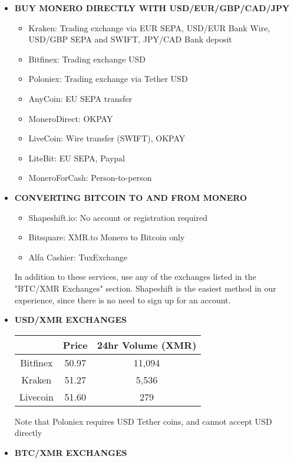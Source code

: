 	\begin{itemize}
		\item \textbf{BUY MONERO DIRECTLY WITH USD/EUR/GBP/CAD/JPY}
			\begin{itemize}
				\item Kraken: Trading exchange via EUR SEPA, USD/EUR Bank Wire, USD/GBP SEPA and SWIFT, JPY/CAD Bank deposit
				\item Bitfinex: Trading exchange USD
				\item Poloniex: Trading exchange via Tether USD
				\item AnyCoin: EU SEPA transfer
				\item MoneroDirect: OKPAY
				\item LiveCoin: Wire transfer (SWIFT), OKPAY
				\item LiteBit: EU SEPA, Paypal
				\item MoneroForCash: Person-to-person
			\end{itemize}
		\item \textbf{CONVERTING BITCOIN TO AND FROM MONERO}
			\begin{itemize}
				\item Shapeshift.io: No account or registration required
				\item Bitsquare: XMR.to Monero to Bitcoin only
				\item Alfa Cashier: TuxExchange
			\end{itemize}
			In addition to these services, use any of the exchanges listed in the "BTC/XMR Exchanges" section. Shapeshift is the easiest method in our experience, since there is no need to sign up for an account.
		\item \textbf{USD/XMR EXCHANGES}
			\begin{table}[H]
				\centering
				\begin{tabular}{ccc}
					\hline
						&Price	&24hr Volume (XMR)\\
					\hline
					Bitfinex	&50.97	&11,094 \\
					\hline
					Kraken	&51.27	&5,536 \\
					\hline
					Livecoin	&51.60	&279 \\
					\hline
				\end{tabular}
			\end{table}
			Note that Poloniex requires USD Tether coins, and cannot accept USD directly
		\item \textbf{BTC/XMR EXCHANGES}
			\begin{table}[htbp!]
				\centering
				\begin{tabular}{ccc}

\end{tabular}
\end{table}
\end{itemize}
